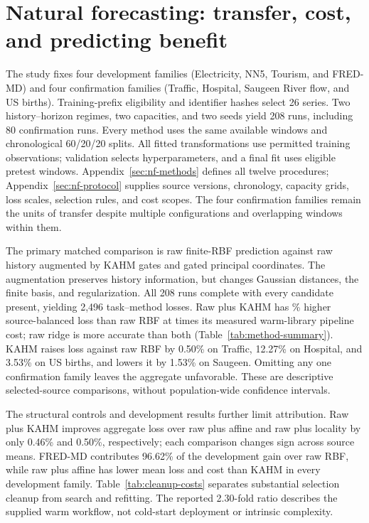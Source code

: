 \section{Natural forecasting: transfer, cost, and predicting benefit}\label{sec:natural}
The study fixes four development families (Electricity, NN5, Tourism,
and FRED-MD) and four confirmation families (Traffic, Hospital, Saugeen
River flow, and US births). Training-prefix eligibility and identifier
hashes select 26 series. Two history--horizon regimes, two capacities,
and two seeds yield 208 runs, including 80 confirmation runs. Every
method uses the same available windows and chronological 60/20/20
splits. All fitted transformations use permitted training observations;
validation selects hyperparameters, and a final fit uses eligible
pretest windows. Appendix~\ref{sec:nf-methods} defines all twelve
procedures; Appendix~\ref{sec:nf-protocol} supplies source versions,
chronology, capacity grids, loss scales, selection rules, and cost scopes.
The four confirmation families remain the units of transfer despite
multiple configurations and overlapping windows within them.

The primary matched comparison is raw finite-RBF prediction against
raw history augmented by KAHM gates and gated principal coordinates.
The augmentation preserves history information, but changes Gaussian
distances, the finite basis, and regularization. All 208 runs complete
with every candidate present, yielding 2,496 task--method losses.
Raw plus KAHM has \NaturalErrorIncrease\% higher source-balanced loss
than raw RBF at \NaturalCostRatio{} times its measured warm-library
pipeline cost; raw ridge is more accurate than both
(Table~\ref{tab:method-summary}). KAHM raises loss against raw RBF by
0.50\% on Traffic, 12.27\% on Hospital, and 3.53\% on US births,
and lowers it by 1.53\% on Saugeen. Omitting any one confirmation
family leaves the aggregate unfavorable. These are descriptive selected-source
comparisons, without population-wide confidence intervals.

The structural controls and development results further limit
attribution. Raw plus KAHM improves aggregate loss over raw plus affine
and raw plus locality by only 0.46\% and 0.50\%, respectively; each
comparison changes sign across source means. FRED-MD contributes
96.62\% of the development gain over raw RBF, while raw plus affine
has lower mean loss and cost than KAHM in every development family.
Table~\ref{tab:cleanup-costs} separates substantial selection cleanup
from search and refitting. The reported 2.30-fold ratio describes the
supplied warm workflow, not cold-start deployment or intrinsic complexity.

